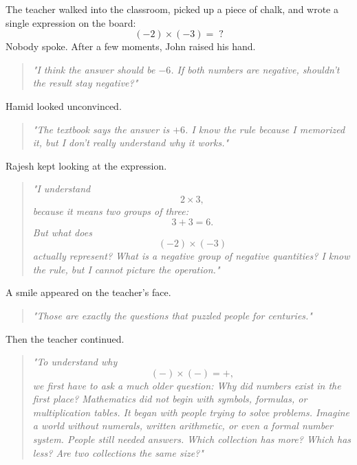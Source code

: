 \documentclass[11pt]{article}
\begin{document}
The teacher walked into the classroom, picked up a piece of chalk, and wrote a single expression on the board:
\[(-2)\times(-3)=\;?\]
Nobody spoke.
After a few moments, John raised his hand.
\begin{quote}
\emph{"I think the answer should be $-6$. If both numbers are negative, shouldn't the result stay negative?"}
\end{quote}
Hamid looked unconvinced.
\begin{quote}
\emph{"The textbook says the answer is $+6$. I know the rule because I memorized it, but I don't really understand why it works."}
\end{quote}
Rajesh kept looking at the expression.
\begin{quote}
\emph{"I understand
\[
2\times3,
\]
because it means two groups of three:
\[3+3=6.\]
But what does
\[(-2)\times(-3)\]
actually represent? What is a negative group of negative quantities? I know the rule, but I cannot picture the operation."}
\end{quote}
A smile appeared on the teacher's face.
\begin{quote}
\emph{"Those are exactly the questions that puzzled people for centuries."}
\end{quote}
Then the teacher continued.
\begin{quote}
\emph{"To understand why
\[(-)\times(-)=+,\]
we first have to ask a much older question: Why did numbers exist in the first place? Mathematics did not begin with symbols, formulas, or multiplication tables. It began with people trying to solve problems. Imagine a world without numerals, written arithmetic, or even a formal number system. People still needed answers. Which collection has more? Which has less? Are two collections the same size?"}
\end{quote}

\end{document}
